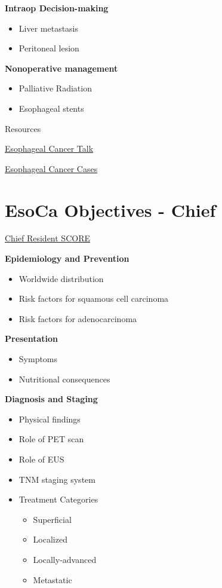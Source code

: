 \documentclass[
  letterpaper,
]{scrbook}
\providecommand{\tightlist}{%
  \setlength{\itemsep}{0pt}\setlength{\parskip}{0pt}}
\begin{document}
\textbf{Intraop Decision-making}

\begin{itemize}
\tightlist
\item
  Liver metastasis
\item
  Peritoneal lesion
\end{itemize}

\textbf{Nonoperative management}

\begin{itemize}
\tightlist
\item
  Palliative Radiation
\item
  Esophageal stents
\end{itemize}

Resources

\href{https://gisurgonc.github.io/talks/eso_ca_rx_talk.htm}{Esophageal
Cancer Talk}

\href{https://gisurgonc.github.io/talks/eso_ca_cases.htm}{Esophageal
Cancer Cases}

\chapter{EsoCa Objectives - Chief}\label{EsoObjCR}

\href{https://www.surgicalcore.org/modulecontent.aspx?id=1000690}{Chief
Resident SCORE}

\textbf{Epidemiology and Prevention}

\begin{itemize}
\tightlist
\item
  Worldwide distribution
\item
  Risk factors for squamous cell carcinoma
\item
  Risk factors for adenocarcinoma
\end{itemize}

\textbf{Presentation}

\begin{itemize}
\tightlist
\item
  Symptoms
\item
  Nutritional consequences
\end{itemize}

\textbf{Diagnosis and Staging}

\begin{itemize}
\tightlist
\item
  Physical findings
\item
  Role of PET scan
\item
  Role of EUS
\item
  TNM staging system
\item
  Treatment Categories

  \begin{itemize}
  \tightlist
  \item
    Superficial
  \item
    Localized
  \item
    Locally-advanced
  \item
    Metastatic
  \end{itemize}
\end{itemize}
\end{document}
